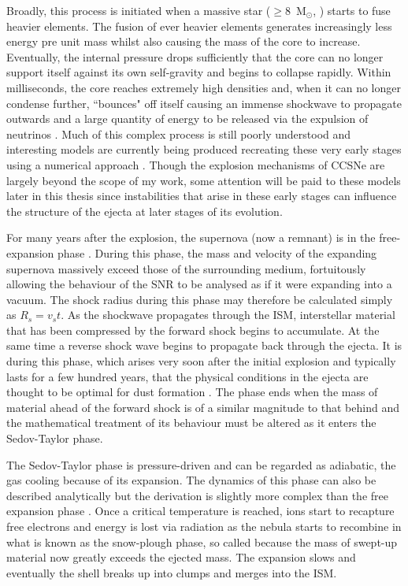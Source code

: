 Broadly, this process is initiated when a massive star ($\ge 8$~M$_{\odot}$, \citealt{Botticella2012}) starts to fuse heavier elements. The fusion of ever heavier elements generates increasingly less energy pre unit mass whilst also causing the mass of the core to increase.  Eventually, the internal pressure drops sufficiently that the core can no longer support itself against its own self-gravity and begins to collapse rapidly. Within milliseconds, the core reaches extremely high densities and, when it can no longer condense further, ``bounces" off itself causing  an immense shockwave to propagate outwards and a large quantity of energy to be released via the expulsion of neutrinos \citep{Kotake2006}.  Much of this complex process is still poorly understood and interesting models are currently being produced recreating these very early stages using a numerical approach \citep{Hammer2010,Takiwaki2014,Wongwathanarat2015}.  Though the explosion mechanisms of CCSNe are largely beyond the scope of my work, some attention will be paid to these models later in this thesis since instabilities that arise in these early stages can influence the structure of the ejecta at later stages of its evolution.

For many years after the explosion, the supernova (now a remnant) is in the free-expansion phase \citep{Landau1959,Ostriker1988}. During this phase, the mass and velocity of the expanding supernova massively exceed those of the surrounding medium, fortuitously allowing the behaviour of the SNR to be analysed as if it were expanding into a vacuum.  The shock radius during this phase may therefore be calculated simply as $R_s = v_s t$.  As the shockwave propagates through the ISM, interstellar material that has been compressed by the forward shock begins to accumulate.  At the same time a reverse shock wave begins to propagate back through the ejecta.  It is during this phase, which arises very soon after the initial explosion and typically lasts for a few hundred years, that the physical conditions in the ejecta are thought to be optimal for dust formation \citep{Todini2001,Bianchi2007,Cherchneff2010,Sarangi2013}.  The phase ends when the mass of material ahead of the forward shock is of a similar magnitude to that behind and the mathematical treatment of its behaviour must be altered as it enters the Sedov-Taylor phase.
 
The Sedov-Taylor phase is pressure-driven and can be regarded as adiabatic, the gas cooling because of its expansion. The dynamics of this phase can also be described analytically but the derivation is slightly more complex than the free expansion phase \citep{Taylor1950,Sedov1959}.  Once a critical temperature is reached, ions start to recapture free electrons and energy is lost via radiation as the nebula starts to recombine in what is known as the snow-plough phase, so called because the mass of swept-up material now greatly exceeds the ejected mass.  The expansion slows and eventually the shell breaks up into clumps and merges into the ISM.

